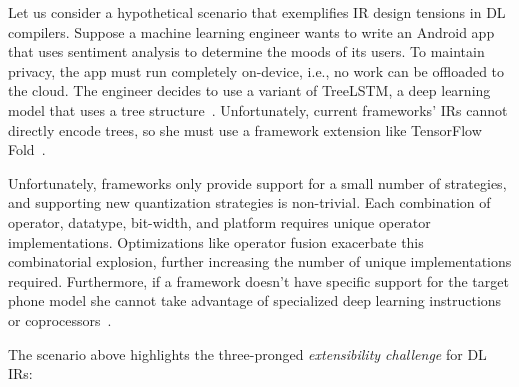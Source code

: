   Let us consider a hypothetical scenario that exemplifies
    IR design tensions in DL compilers.
  Suppose a machine learning engineer wants to write
    an Android app that uses sentiment analysis to
    determine the moods of its users.
  To maintain privacy, the app must run completely on-device,
    i.e., no work can be offloaded to the cloud.
  The engineer decides to use a variant of TreeLSTM,
    a deep learning model that uses a tree structure~\citep{tree_lstm}.
  Unfortunately, current frameworks' IRs cannot directly encode trees,
    so she must use a framework extension
    like TensorFlow Fold~\citep{tensorflowfold}.

  Unfortunately, frameworks only provide support for a small number
    of strategies, and supporting new quantization strategies is non-trivial.
  Each combination of operator, datatype, bit-width, and
    platform requires unique operator implementations.
  Optimizations like operator fusion exacerbate this combinatorial explosion,
    further increasing
    the number of unique implementations required.
  Furthermore, if a framework doesn't have specific support for
    the target phone model she cannot take advantage of specialized deep learning
    instructions or coprocessors~\citep{apple_neural_engine}.

  The scenario above highlights the three-pronged \textit{extensibility challenge}
    for DL IRs:

